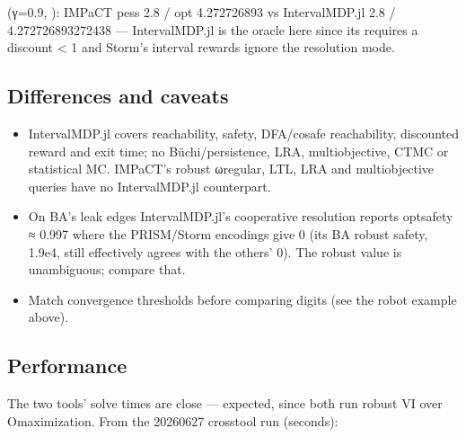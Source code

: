 \documentclass[a4paper,10pt,english]{sphinxmanual}
\begin{document}
\sphinxAtStartPar
{} (γ=0.9, ): IMPaCT pess 2.8 / opt 4.272726893 vs
IntervalMDP.jl 2.8 / 4.272726893272438 — IntervalMDP.jl is the oracle here since its
 requires a discount \textless{} 1 and Storm’s interval rewards ignore the
resolution mode.


\subsection{Differences and caveats}
\label{\detokenize{comparison/impact-vs-intervalmdp:differences-and-caveats}}\begin{itemize}
\item {} 
\sphinxAtStartPar
{} IntervalMDP.jl covers reachability, safety, DFA/co\sphinxhyphen{}safe
reachability, discounted reward and exit time; no Büchi/persistence, LRA,
multi\sphinxhyphen{}objective, CTMC or statistical MC. IMPaCT’s robust ω\sphinxhyphen{}regular, LTL, LRA and
multi\sphinxhyphen{}objective queries have no IntervalMDP.jl counterpart.

\item {} 
\sphinxAtStartPar
{} On BA’s \sphinxcode{\sphinxupquote{{[}0,hi{]}}} leak edges IntervalMDP.jl’s
cooperative resolution reports opt\sphinxhyphen{}safety ≈ 0.997 where the PRISM/Storm 
encodings give 0 (its BA robust safety, 1.9e\sphinxhyphen{}4, still effectively agrees with the
others’ 0). The robust value is unambiguous; compare that.

\item {} 
\sphinxAtStartPar
{} Match convergence thresholds before comparing digits (see the robot
example above).

\end{itemize}


\subsection{Performance}
\label{\detokenize{comparison/impact-vs-intervalmdp:performance}}
\sphinxAtStartPar
The two tools’ solve times are close — expected, since both run robust VI over
O\sphinxhyphen{}maximization. From the 2026\sphinxhyphen{}06\sphinxhyphen{}27 cross\sphinxhyphen{}tool run (seconds):
\end{document}
